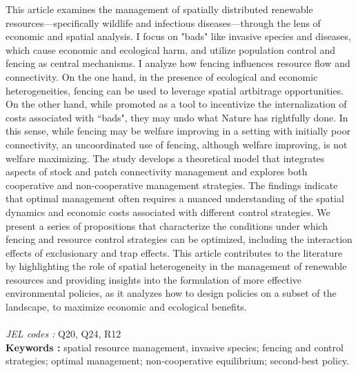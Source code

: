 \begin{minipage}{0.9\textwidth}

This article examines the management of spatially distributed renewable resources—specifically wildlife and infectious diseases—through the lens of economic and spatial analysis. I focus on "bads" like invasive species and diseases, which cause economic and ecological harm, and utilize population control and fencing as central  mechanisms. I analyze how fencing influences resource flow and connectivity. On the one hand, in the presence of ecological and economic heterogeneities, fencing can be used to leverage spatial artbitrage opportunities. On the other hand, while promoted as a tool to incentivize the internalization of costs associated with ``bads", they may undo what Nature has rightfully done. In this sense, while fencing may be welfare improving in a setting with initially poor connectivity, an uncoordinated use of fencing, although welfare improving, is not welfare maximizing. The study develops a theoretical model that integrates aspects of stock and patch connectivity management and explores both cooperative and non-cooperative management strategies. The findings indicate that optimal management often requires a nuanced understanding of the spatial dynamics and economic costs associated with different control strategies. We present a series of propositions that characterize the conditions under which fencing and resource control strategies can be optimized, including the interaction effects of exclusionary and trap effects. This article contributes to the literature by highlighting the role of spatial heterogeneity in the management of renewable resources and providing insights into the formulation of more effective environmental policies, as it analyzes how to design policies on a subset of the landscape, to maximize economic and ecological benefits. \\\\
\textit{JEL codes :} Q20, Q24, R12\\
\textbf{Keywords :} spatial resource management, invasive species; fencing and control strategies; optimal management; non-cooperative equilibrium; second-best policy.
\end{minipage}

